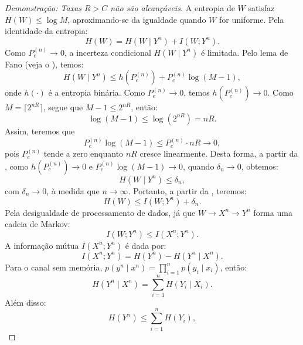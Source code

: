 \begin{proof}[Demonstração: Taxas $R > C$ não são alcançáveis]
A entropia de $W$ satisfaz $H(W) \leq \log M$, aproximando-se da igualdade quando $W$ for uniforme. Pela identidade da entropia:
\begin{equation}\label{eq:HWmidYnIWYn}
H(W) = H(W \mid Y^n) + I(W; Y^n).
\end{equation}
Como $P_e^{(n)} \to 0$, a incerteza condicional $H(W \mid Y^n)$ é limitada. Pelo lema de Fano (veja o ), temos:
\begin{equation}\label{eq:HWmidYnlimsup}
H(W \mid Y^n) \leq h(P_e^{(n)}) + P_e^{(n)} \log (M - 1),
\end{equation}
onde $h(\cdot)$ é a entropia binária. 
Como $P_e^{(n)} \to 0$, temos $h(P_e^{(n)}) \to 0$.
Como $M = \lceil 2^{nR} \rceil$, segue que $M - 1 \leq 2^{nR}$, então:
\begin{equation}
\log (M - 1) \leq \log (2^{nR}) = nR.
\end{equation}
Assim, teremos que 
\begin{equation}
P_e^{(n)} \log (M - 1) \leq P_e^{(n)} \cdot nR \to 0,
\end{equation}
pois $P_e^{(n)}$ tende a zero enquanto $nR$ cresce linearmente.
Desta forma, a partir da , como $h(P_e^{(n)}) \to 0$
  e $P_e^{(n)} \log (M - 1) \to 0$, quando $\delta_n \to 0$, obtemos:
\begin{equation}
H(W \mid Y^n) \leq \delta_n , 
\end{equation}
com $\delta_n \to 0$, à medida que $n \to \infty$. Portanto, a partir da , teremos:
\begin{equation}\label{eq:HWleqIWYn}
H(W) \leq I(W; Y^n) + \delta_n.
\end{equation}
Pela desigualdade de processamento de dados, já que $W \to X^n \to Y^n$ forma uma cadeia de Markov:
\begin{equation}
I(W; Y^n) \leq I(X^n; Y^n).
\end{equation}
A informação mútua $I(X^n; Y^n)$ é dada por:
\begin{equation}
I(X^n; Y^n) = H(Y^n) - H(Y^n \mid X^n).
\end{equation}
Para o canal sem memória, $p(y^n \mid x^n) = \prod_{i=1}^n p(y_i \mid x_i)$, então:
\begin{equation}
H(Y^n \mid X^n) = \sum_{i=1}^n H(Y_i \mid X_i).
\end{equation}
Além disso:
\begin{equation}
H(Y^n) \leq \sum_{i=1}^n H(Y_i),
\end{equation}

\end{proof}
